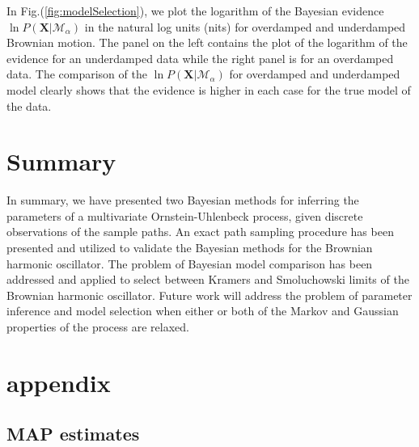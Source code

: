 \documentclass[english,aps, twocolumn, pre,superscriptaddress, notitlepage]{revtex4-1}
\begin{document}
In Fig.(\ref{fig:modelSelection}), we plot the logarithm of the Bayesian
evidence $\ln P(\boldsymbol{X}|\mathcal{M}_{\alpha})$ in the natural
log units (nits) for overdamped and underdamped Brownian motion. The
panel on the left contains the plot of the logarithm of the evidence
for an underdamped data while the right panel is for an overdamped
data. The comparison of the $\ln P(\boldsymbol{X}|\mathcal{M}_{\alpha})$
for overdamped and underdamped model clearly shows that the evidence
is higher in each case for the true model of the data. 

\section{Summary\label{sec:conclusion}}

In summary, we have presented two Bayesian methods for inferring the
parameters of a multivariate Ornstein-Uhlenbeck process, given discrete
observations of the sample paths. An exact path sampling procedure
has been presented and utilized to validate the Bayesian methods for
the Brownian harmonic oscillator. The problem of Bayesian model comparison
has been addressed and applied to select between Kramers and Smoluchowski
limits of the Brownian harmonic oscillator. Future work will address
the problem of parameter inference and model selection when either
or both of the Markov and Gaussian properties of the process are relaxed.

\widetext

\section*{appendix\label{sec:appendix}}

\subsection*{MAP estimates}
\end{document}

